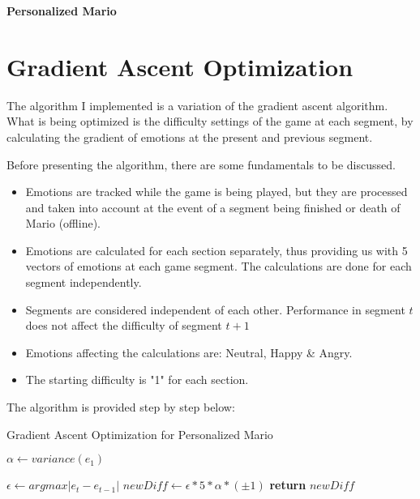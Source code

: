 \documentclass[11pt]{article}
\begin{document}
\begin{center}
\textbf{Personalized Mario}

\end{center}

\section{Gradient Ascent Optimization}
The algorithm I implemented is a variation of the gradient ascent algorithm.  
What is being optimized is the difficulty settings of the game at each segment, by calculating the gradient of emotions at the present and previous segment. 

Before presenting the algorithm, there are some fundamentals to be discussed. 

\begin{itemize}


\item Emotions are tracked while the game is being played, but they are processed and taken into account at the event of a segment being finished or death of Mario (offline).
\item Emotions are calculated for each section separately, thus providing us with 5 vectors of emotions at each game segment. The calculations are done for each segment independently. 
\item Segments are considered independent of each other. Performance in segment $t$ does not affect the difficulty of segment $t+1$
\item Emotions affecting the calculations are: Neutral, Happy \& Angry.
\item The starting difficulty is "1" for each section.
\end{itemize}

The algorithm is provided step by step below: 


\begin{algorithm}
\caption{Gradient Ascent Optimization for Personalized Mario}\label{euclid}
\begin{algorithmic}[1]

   \State $\alpha\gets variance(e_1)$

      \State $\epsilon\gets argmax|e_t-e_{t-1}|$ 
      \State $newDiff\gets\epsilon*5*\alpha*(\pm1)$
      \State \textbf{return} $newDiff$
   \EndFor
   
\EndProcedure
\end{algorithmic}
\end{algorithm}
\end{document}
